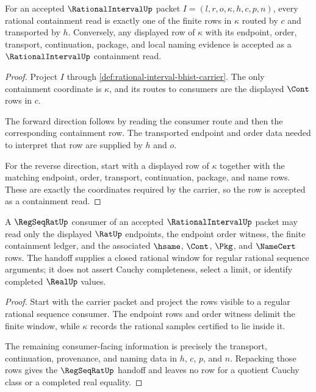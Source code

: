\begin{theorem}
\label{thm:rational-interval-containment-ledger-exactness}
For an accepted $\RationalIntervalUp$ packet
$I=(l,r,o,\kappa,h,c,p,n)$, every rational containment read is exactly one of
the finite rows in $\kappa$ routed by $c$ and transported by $h$. Conversely,
any displayed row of $\kappa$ with its endpoint, order, transport,
continuation, package, and local naming evidence is accepted as a
$\RationalIntervalUp$ containment read.
\end{theorem}
\begin{proof}
Project $I$ through
\autoref{def:rational-interval-bhist-carrier}. The only containment
coordinate is $\kappa$, and its routes to consumers are the displayed
$\Cont$ rows in $c$.

The forward direction follows by reading the consumer route and then the
corresponding containment row. The transported endpoint and order data needed
to interpret that row are supplied by $h$ and $o$.

For the reverse direction, start with a displayed row of $\kappa$ together
with the matching endpoint, order, transport, continuation, package, and name
rows. These are exactly the coordinates required by the carrier, so the row
is accepted as a containment read.
\end{proof}

\begin{theorem}
\label{thm:rational-interval-regseqrat-handoff}
A $\RegSeqRatUp$ consumer of an accepted $\RationalIntervalUp$ packet may read
only the displayed $\RatUp$ endpoints, the endpoint order witness, the finite
containment ledger, and the associated $\hsame$, $\Cont$, $\Pkg$, and
$\NameCert$ rows. The handoff supplies a closed rational window for regular
rational sequence arguments; it does not assert Cauchy completeness, select a
limit, or identify completed $\RealUp$ values.
\end{theorem}
\begin{proof}
Start with the carrier packet and project the rows visible to a regular
rational sequence consumer. The endpoint rows and order witness delimit the
finite window, while $\kappa$ records the rational samples certified to lie
inside it.

The remaining consumer-facing information is precisely the transport,
continuation, provenance, and naming data in $h$, $c$, $p$, and $n$.
Repacking those rows gives the $\RegSeqRatUp$ handoff and leaves no row for a
quotient Cauchy class or a completed real equality.
\end{proof}

